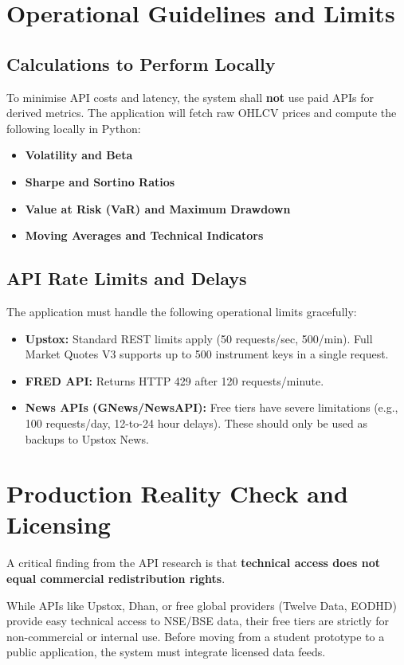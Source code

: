 \documentclass[12pt, a4paper, openany, oneside]{report}
\begin{document}
\section{Operational Guidelines and Limits}

\subsection{Calculations to Perform Locally}
To minimise API costs and latency, the system shall \textbf{not} use paid APIs for derived metrics. The application will fetch raw OHLCV prices and compute the following locally in Python:
\begin{itemize}
    \item \textbf{Volatility and Beta}
    \item \textbf{Sharpe and Sortino Ratios}
    \item \textbf{Value at Risk (VaR) and Maximum Drawdown}
    \item \textbf{Moving Averages and Technical Indicators}
\end{itemize}

\subsection{API Rate Limits and Delays}
The application must handle the following operational limits gracefully:
\begin{itemize}
    \item \textbf{Upstox:} Standard REST limits apply (50 requests/sec, 500/min). Full Market Quotes V3 supports up to 500 instrument keys in a single request.
    \item \textbf{FRED API:} Returns HTTP 429 after 120 requests/minute.
    \item \textbf{News APIs (GNews/NewsAPI):} Free tiers have severe limitations (e.g., 100 requests/day, 12-to-24 hour delays). These should only be used as backups to Upstox News.
\end{itemize}

\section{Production Reality Check and Licensing}

A critical finding from the API research is that \textbf{technical access does not equal commercial redistribution rights}. 

While APIs like Upstox, Dhan, or free global providers (Twelve Data, EODHD) provide easy technical access to NSE/BSE data, their free tiers are strictly for non-commercial or internal use. Before moving from a student prototype to a public application, the system must integrate licensed data feeds.
\end{document}
